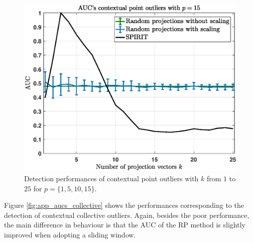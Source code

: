 \begin{figure}[h]
	\includegraphics[scale=0.36]{analysis/AUCs_contextual3}
	\caption{Detection performances of contextual point outliers with $k$ from $1$ to $25$ for $p=\{1,5,10,15\}$.}
	\label{fig:app_aucs_contextual}
\end{figure}

Figure \ref{fig:app_aucs_collective} shows the performances corresponding to the detection of contextual collective outliers. Again, besides the poor performance, the main difference in behaviour is that the AUC of the RP method is slightly improved when adopting a sliding window.

